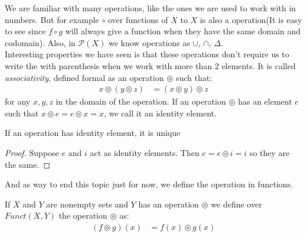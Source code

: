 \documentclass{tufte-handout}
\begin{document}
We are familiar with many operations, like the ones we are used to work with in numbers. But for example $\circ$ over functions of $X$ to $X$ is also a operation(It is easy to see since $f \circ g$ will always give a function when they have the same domain and codomain). Also, in $\mathcal{P}(X)$ we know operations as $\cup$, $\cap$, $\Delta$. \\

Interesting properties we have seen is that these operations don't require us to write the with parenthesis when we work with more than 2 elements. It is called \textit{associativity}, defined formal as an operation $\circledcirc$ such that:
\begin{align*}
	x \circledcirc (y \circledcirc z) &= (x \circledcirc y) \circledcirc z
\end{align*}
for any $x, y, z$ in the domain of the operation. If an operation $\circledcirc$ has an element $e$ such that $x \circledcirc e = e \circledcirc x = x$, we call it an identity element. 

\begin{theorem}
	If an operation has identity element, it is unique
\end{theorem}
\begin{proof}
	Suppose $e$ and $i$ act as identity elements. Then $e = e \circledcirc i = i$ so they are the same.
\end{proof}

And as way to end this topic just for now, we define the operation in functions.
\begin{definition}
	If $X$ and $Y$ are nonempty sets and $Y$ has an operation $\circledcirc$ we define over $Funct(X, Y)$ the operation $\circledcirc$ as:
	\begin{align*}
		(f \circledcirc g)(x) &= f(x) \circledcirc g(x)
	\end{align*}
\end{definition}
\end{document}
